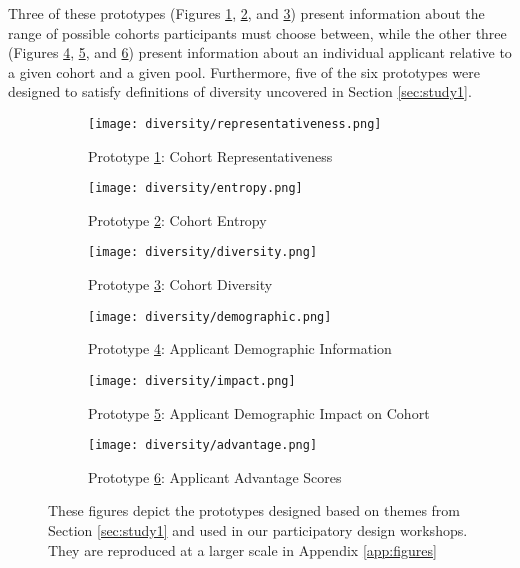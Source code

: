 Three of these prototypes (Figures \ref{fig:representativeness}, \ref{fig:entropy}, and \ref{fig:diversity}) present information about the range of possible cohorts participants must choose between, while the other three (Figures \ref{fig:demographic}, \ref{fig:impact}, and \ref{fig:advantage}) present information about an individual applicant relative to a given cohort and a given pool. Furthermore, five of the six prototypes were designed to satisfy definitions of diversity uncovered in Section \ref{sec:study1}.

\begin{figure}[htbp]
    \centering
    \begin{subfigure}[b]{0.3\textwidth}
        \texttt{[image: diversity/representativeness.png]}
        \caption{Prototype \ref{fig:representativeness}: Cohort Representativeness}
        \label{fig:representativeness}
    \end{subfigure}
    \hfill
    \begin{subfigure}[b]{0.3\textwidth}
        \texttt{[image: diversity/entropy.png]}
        \caption{Prototype \ref{fig:entropy}: Cohort Entropy}
        \label{fig:entropy}
    \end{subfigure}
    \hfill
    \begin{subfigure}[b]{0.3\textwidth}
        \texttt{[image: diversity/diversity.png]}
        \caption{Prototype \ref{fig:diversity}: Cohort Diversity}
        \label{fig:diversity}
    \end{subfigure}

    \medskip

    \begin{subfigure}[b]{0.3\textwidth}
        \texttt{[image: diversity/demographic.png]}
        \caption{Prototype \ref{fig:demographic}: Applicant Demographic Information}
        \label{fig:demographic}
    \end{subfigure}
    \hfill
    \begin{subfigure}[b]{0.3\textwidth}
        \texttt{[image: diversity/impact.png]}
        \caption{Prototype \ref{fig:impact}: Applicant Demographic Impact on Cohort}
        \label{fig:impact}
    \end{subfigure}
    \hfill
    \begin{subfigure}[b]{0.3\textwidth}
        \texttt{[image: diversity/advantage.png]}
        \caption{Prototype \ref{fig:advantage}: Applicant Advantage Scores}
        \label{fig:advantage}
    \end{subfigure}
    \caption{These figures depict the prototypes designed based on themes from Section \ref{sec:study1} and used in our participatory design workshops. They are reproduced at a larger scale in Appendix \ref{app:figures}}
    \label{fig:prototypes}
\end{figure}

